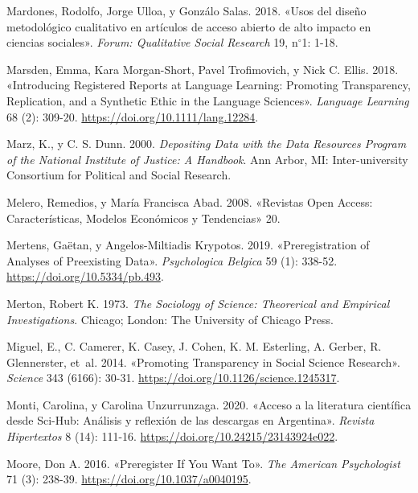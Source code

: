\documentclass[
  spanish,
  letterpaper,
  DIV=11,
  numbers=noendperiod]{scrreprt}
\newlength{\cslhangindent}
\newenvironment{CSLReferences}[2] %
 {\begin{list}{}{%
  \setlength{\itemindent}{0pt}
  \setlength{\leftmargin}{0pt}
  \setlength{\parsep}{0pt}
  \ifodd #1
   \setlength{\leftmargin}{\cslhangindent}
   \setlength{\itemindent}{-1\cslhangindent}
  \fi
  \setlength{\itemsep}{#2\baselineskip}}}
 {\end{list}}
\begin{document}
\begin{CSLReferences}{1}{0}
Mardones, Rodolfo, Jorge Ulloa, y Gonzálo Salas. 2018. {«{Usos del
dise{ñ}o metodol{ó}gico cualitativo en art{í}culos de acceso abierto de
alto impacto en ciencias sociales}»}. \emph{Forum: Qualitative Social
Research} 19, n{\(^\circ\)}1: 1-18.

Marsden, Emma, Kara Morgan-Short, Pavel Trofimovich, y Nick C. Ellis.
2018. {«Introducing {Registered Reports} at {Language Learning}:
{Promoting Transparency}, {Replication}, and a {Synthetic Ethic} in the
{Language Sciences}»}. \emph{Language Learning} 68 (2): 309-20.
\url{https://doi.org/10.1111/lang.12284}.

Marz, K., y C. S. Dunn. 2000. \emph{Depositing Data with the {Data
Resources Program} of the {National Institute} of {Justice}: {A}
Handbook}. Ann Arbor, MI: {Inter-university Consortium for Political and
Social Research}.

Melero, Remedios, y María Francisca Abad. 2008. {«Revistas {Open
Access}: Caracter{í}sticas, Modelos Econ{ó}micos y Tendencias»} 20.

Mertens, Gaëtan, y Angelos-Miltiadis Krypotos. 2019. {«Preregistration
of {Analyses} of {Preexisting Data}»}. \emph{Psychologica Belgica} 59
(1): 338-52. \url{https://doi.org/10.5334/pb.493}.

Merton, Robert K. 1973. \emph{The {Sociology} of {Science}:
{Theorerical} and {Empirical Investigations}}. Chicago; London: The
University of Chicago Press.

Miguel, E., C. Camerer, K. Casey, J. Cohen, K. M. Esterling, A. Gerber,
R. Glennerster, et~al. 2014. {«Promoting {Transparency} in {Social
Science Research}»}. \emph{Science} 343 (6166): 30-31.
\url{https://doi.org/10.1126/science.1245317}.

Monti, Carolina, y Carolina Unzurrunzaga. 2020. {«{Acceso a la
literatura cient{í}fica desde Sci-Hub: An{á}lisis y reflexi{ó}n de las
descargas en Argentina}»}. \emph{Revista Hipertextos} 8 (14): 111-16.
\url{https://doi.org/10.24215/23143924e022}.

Moore, Don A. 2016. {«Preregister If You Want To»}. \emph{The American
Psychologist} 71 (3): 238-39. \url{https://doi.org/10.1037/a0040195}.


\end{CSLReferences}
\end{document}
